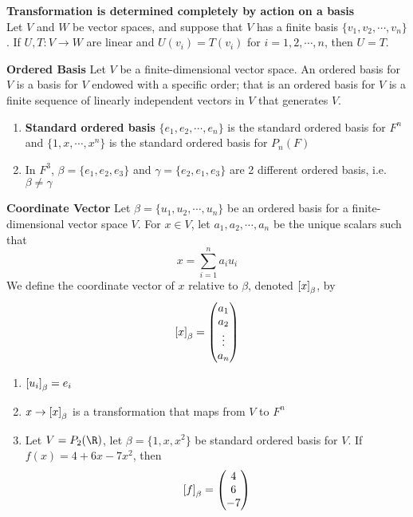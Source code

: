 \documentclass[11pt]{article}
\begin{document}
\begin{corollary*}
    \textbf{Transformation is determined completely by action on a basis} \\
    Let $V$ and $W$ be vector spaces, and suppose that $V$ has a finite basis $\{v_1,v_2,\cdots, v_n\}$. If $U,T:V\to W$ are linear and $U(v_i) = T(v_i)$ for $i=1,2,\cdots, n$, then $U=T$.
\end{corollary*}



\begin{defn*}
    \textbf{Ordered Basis} Let $V$ be a finite-dimensional vector space. An ordered basis for $V$ is a basis for $V$ endowed with a specific order; that is an ordered basis for $V$ is a finite sequence of linearly independent vectors in $V$ that generates $V$. 
    \begin{enumerate}
        \item \textbf{Standard ordered basis} $\{e_1,e_2,\cdots, e_n\}$ is the standard ordered basis for $F^n$ and $\{1,x,\cdots, x^n\}$ is the standard ordered basis for $P_n(F)$ 
        \item In $F^3$, $\beta = \{e_1,e_2,e_3 \}$ and $\gamma = \{e_2,e_1,e_3\}$ are 2 different ordered basis, i.e. $\beta \neq \gamma$
    \end{enumerate}
\end{defn*}


\begin{defn*}
    \textbf{Coordinate Vector} Let $\beta = \{u_1,u_2,\cdots, u_n\}$ be an ordered basis for a finite-dimensional vector space $V$. For $x\in V$, let $a_1,a_2,\cdots, a_n$ be the unique scalars such that 
    \[
         x = \sum_{i=1}^n a_i u_i    
    \]
    We define the coordinate vector of $x$ relative to $\beta$, denoted $\left[ x \right]_{\beta}$, by 
    \[
        \left[ x \right]_{\beta} = 
        \begin{pmatrix}
            a_1 \\ a_2 \\  \vdots \\ a_n \\
        \end{pmatrix}
    \]
    \begin{enumerate}
        \item $\left[ u_i \right]_{\beta} = e_i$
        \item $x\to \left[ x \right]_{\beta}$ is a transformation that maps from $V$ to $F^n$
        \item Let $V=P_2(\R)$, let $\beta = \{1,x,x^2\}$ be standard ordered basis for $V$. If $f(x) = 4+6x-7x^2$, then 
        \[
            \left[ f \right]_{\beta} = 
            \begin{pmatrix}
                4 \\ 6 \\ -7 \\ 
            \end{pmatrix}
        \]
    \end{enumerate}
\end{defn*}
\end{document}
